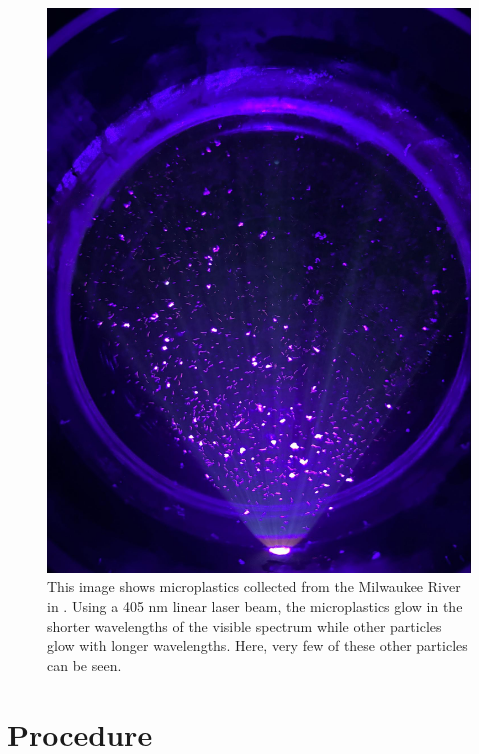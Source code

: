 \documentclass[fleqn,10pt]{SelfArx} %
\begin{document}
	\begin{figure}[h]
		\centering
		\includegraphics[width=1\linewidth]{Figures/FluorescedMPs2}
		\caption[Microplastics Fluorescing]{This image shows microplastics collected from the Milwaukee River in \cite{Isahaku}. Using a 405 nm linear laser beam, the microplastics glow in the shorter wavelengths of the visible spectrum while other particles glow with longer wavelengths. Here, very few of these other particles can be seen.}
		\label{fig:FluorescedMPs}
	\end{figure}
	
	\section{Procedure}
	
\end{document}
